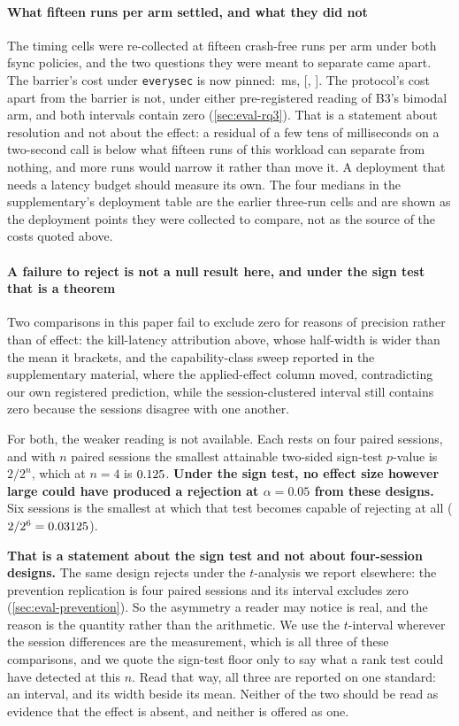 \paragraph{What fifteen runs per arm settled, and what they did not} The
timing cells were re-collected at fifteen crash-free runs per arm under both
fsync policies, and the two questions they were meant to separate came apart.
The barrier's cost under \texttt{everysec} is now pinned:
\BarrierCostFifteen{}\,ms,
[\BarrierCostFifteenLow{}, \BarrierCostFifteenHigh{}]. The protocol's cost
apart from the barrier is not, under either pre-registered reading of B3's
bimodal arm, and both intervals contain zero (\cref{sec:eval-rq3}). That is a
statement about resolution and not about the effect: a residual of a few tens of
milliseconds on a two-second call is below what fifteen runs of this workload
can separate from nothing, and more runs would narrow it rather than move it. A
deployment that needs a latency budget should measure its own. The four medians
in the supplementary's deployment table are the earlier three-run cells and
are shown as the
deployment points they were collected to compare, not as the source of the
costs quoted above.

\paragraph{A failure to reject is not a null result here, and under the sign
test that is a theorem} Two comparisons in this paper fail to exclude zero for
reasons of precision rather than of effect: the kill-latency attribution above,
whose half-width is wider than the mean it brackets, and the capability-class
sweep reported in the supplementary material, where the applied-effect column
moved, contradicting our own registered prediction, while the
session-clustered interval still contains zero because the sessions disagree
with one another.

For both, the weaker reading is not available. Each rests on four paired
sessions, and with $n$ paired sessions the smallest attainable two-sided
sign-test $p$-value is $2/2^{n}$, which at $n=4$ is
$0.125{}$. \textbf{Under the sign test, no effect size however large
could have produced a rejection at $\alpha=0.05$ from these designs.} Six
sessions is the smallest at which that test becomes capable of rejecting at all
($2/2^{6} = 0.03125{}$).

\textbf{That is a statement about the sign test and not about four-session
designs.} The same design rejects under the $t$-analysis we report elsewhere:
the prevention replication is four paired sessions and its interval excludes
zero (\cref{sec:eval-prevention}). So the asymmetry a reader may notice is
real, and the reason is the quantity rather than the arithmetic. We use the
$t$-interval wherever the session differences are the measurement, which is all
three of these comparisons, and we quote the sign-test floor only to say what a
rank test could have detected at this $n$. Read that way, all three are
reported on one standard: an interval, and its width beside its mean. Neither
of the two should be read as evidence that the effect is absent, and neither is
offered as one.

